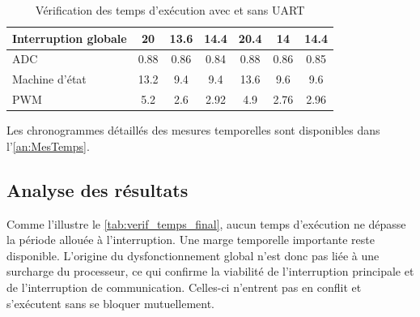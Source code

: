 \begin{table}[H]
{\begin{tabular}{|l|c|c|c|c|c|c|}
            Interruption globale                                   & 20                                                                  & 13.6                                                                   & 14.4                                                                   & 20.4                                                                & 14                                                                     & 14.4                                                                   \\ \hline
            ADC                                                    & 0.88                                                                & 0.86                                                                   & 0.84                                                                   & 0.88                                                                & 0.86                                                                   & 0.85                                                                   \\ \hline
            Machine d'état                                         & 13.2                                                                & 9.4                                                                    & 9.4                                                                    & 13.6                                                                & 9.6                                                                    & 9.6                                                                    \\ \hline
            PWM                                                    & 5.2                                                                 & 2.6                                                                    & 2.92                                                                   & 4.9                                                                 & 2.76                                                                   & 2.96                                                                   \\ \hline
        \end{tabular}%
    }
    \caption{Vérification des temps d'exécution avec et sans UART}
    \label{tab:verif_temps_final}
\end{table}

Les chronogrammes détaillés des mesures temporelles sont disponibles dans l'\autoref{an:MesTemps}.

\subsection{Analyse des résultats}
Comme l'illustre le \autoref{tab:verif_temps_final}, aucun temps d'exécution ne dépasse la période allouée à l'interruption. Une marge temporelle importante reste disponible. L'origine du dysfonctionnement global n'est donc pas liée à une surcharge du processeur, ce qui confirme la viabilité de l'interruption principale et de l'interruption de communication. Celles-ci n'entrent pas en conflit et s'exécutent sans se bloquer mutuellement.

